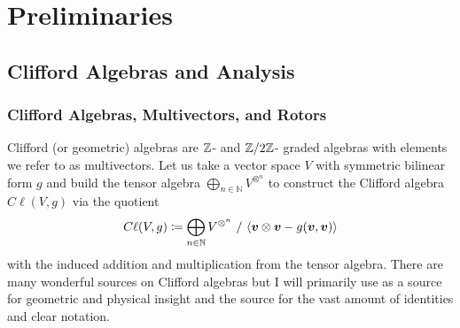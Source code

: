 \documentclass{article}
\begin{document}
%

\section{Preliminaries}

\subsection{Clifford Algebras and Analysis}

\subsubsection{Clifford Algebras, Multivectors, and Rotors}

Clifford (or geometric) algebras are $\mathbb{Z}$- and $\mathbb{Z}/2\mathbb{Z}$- graded algebras with elements we refer to as multivectors. Let us take a vector space $V$ with symmetric bilinear form $g$ and build the tensor algebra $\bigoplus_{n \in \mathbb{N}} V^{\otimes^n}$ to construct the Clifford algebra $C\ell(V,g)$ via the quotient
\begin{equation}
C\ell(V,g) \coloneqq \bigoplus_{n \in \mathbb{N}} V^{\otimes^n} ~ / ~ \langle \boldsymbol{v} \otimes \boldsymbol{v} - g(\boldsymbol{v},\boldsymbol{v}) \rangle
\end{equation}
with the induced addition and multiplication from the tensor algebra. There are many wonderful sources on Clifford algebras but I will primarily use \cite{doran_geometric_2003} as a source for geometric and physical insight and the source \cite{chisolm_geometric_2012} for the vast amount of identities and clear notation. 
\end{document}
